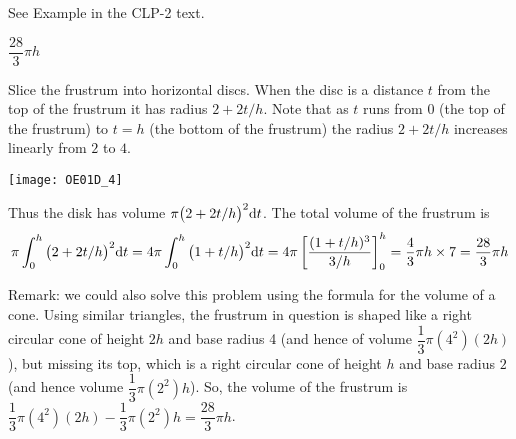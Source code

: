 \begin{hint}
See Example  in the
CLP-2 text.
\end{hint}

\begin{answer}
$\dfrac{28}{3}\pi h$
\end{answer}

\begin{solution}
Slice the frustrum into horizontal discs. When the disc is a distance
$t$ from the top of the frustrum it has radius $2+2t/h$. Note that as $t$
runs from $0$ (the top of the frustrum) to $t=h$ (the bottom of the frustrum)
the radius $2+2t/h$ increases linearly from $2$ to $4$.
\begin{center}
       \texttt{[image: OE01D\_4]}
\end{center}
 Thus the disk has volume $\pi \big(2+2t/h\big)^2 \mathrm{d}t$. The total volume of the
frustrum is
\begin{align*}
\pi\int_0^h \big(2+2t/h\big)^2 \mathrm{d}t
=4\pi\int_0^h \big(1+t/h\big)^2 \mathrm{d}t
=4\pi\left[\frac{(1+t/h)^3}{3/h}\right]_0^h
=\frac{4}{3}\pi h\times 7
=\frac{28}{3}\pi h
\end{align*}

Remark: we could also solve this problem using the formula for the volume of a cone. Using similar triangles, the frustrum in question is shaped like a right circular cone of height $2h$ and base radius 4 (and hence of volume $\dfrac{1}{3}\pi(4^2)(2h)$), but missing its top, which is a right circular cone of height $h$ and base radius $2$ (and hence volume $\dfrac{1}{3}\pi(2^2)h$). So, the volume of the frustrum is $\dfrac{1}{3}\pi(4^2)(2h) - \dfrac{1}{3}\pi(2^2)h = \dfrac{28}{3}\pi h$.
\end{solution}







\subsection*{\Application}

